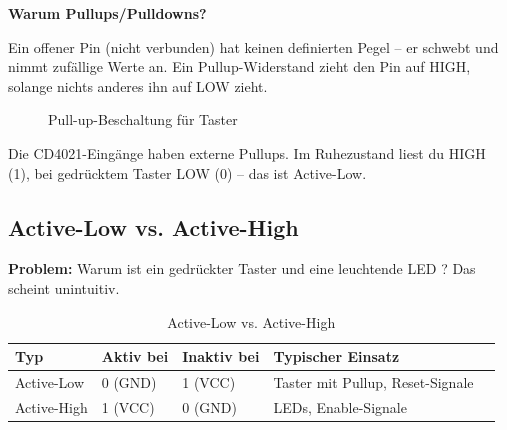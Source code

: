 \textbf{Warum Pullups/Pulldowns?}

Ein offener Pin (nicht verbunden) hat keinen definierten Pegel – er \glqq schwebt\grqq{} und nimmt zufällige Werte an. Ein Pullup-Widerstand zieht den Pin auf HIGH, solange nichts anderes ihn auf LOW zieht.

\begin{figure}[htbp]
\centering
{}
\caption{Pull-up-Beschaltung für Taster}
\label{fig:pullup}
\end{figure}

\begin{infobox}
Die CD4021-Eingänge haben externe Pullups. Im Ruhezustand liest du HIGH (1), bei gedrücktem Taster LOW (0) – das ist Active-Low.
\end{infobox}

\subsection{Active-Low vs. Active-High}

\textbf{Problem:} Warum ist ein gedrückter Taster \grqq{} und eine leuchtende LED \grqq? Das scheint unintuitiv.

\begin{table}[htbp]
\centering
\begin{tabular}{@{}lllll@{}}
\toprule
\textbf{Typ} & \textbf{Aktiv bei} & \textbf{Inaktiv bei} & \textbf{Typischer Einsatz} \\
\midrule
Active-Low  & 0 (GND) & 1 (VCC) & Taster mit Pullup, Reset-Signale \\
Active-High & 1 (VCC) & 0 (GND) & LEDs, Enable-Signale \\
\bottomrule
\end{tabular}
\caption{Active-Low vs. Active-High}
\label{tab:active-low-high}
\end{table}

